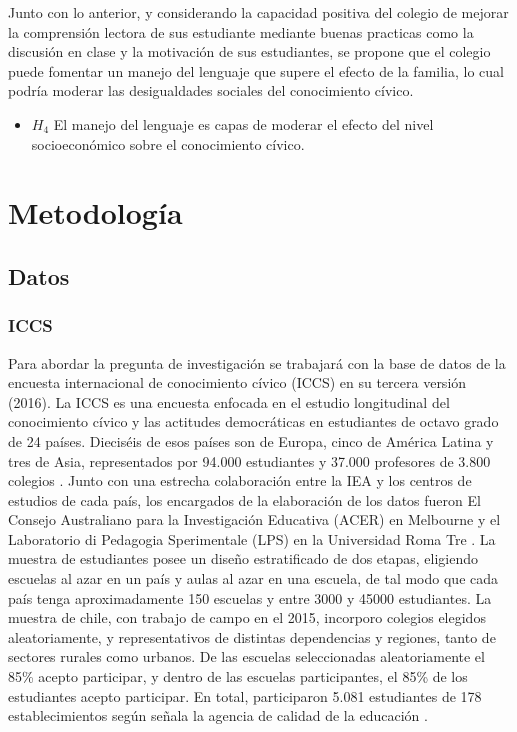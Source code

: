 \documentclass[12pt,twoside]{templates/facsothesis}
\providecommand{\tightlist}{%
  \setlength{\itemsep}{0pt}\setlength{\parskip}{0pt}}
\begin{document}
Junto con lo anterior, y considerando la capacidad positiva del colegio de mejorar la comprensión lectora de sus estudiante mediante buenas practicas como la discusión en clase y la motivación de sus estudiantes, se propone que el colegio puede fomentar un manejo del lenguaje que supere el efecto de la familia, lo cual podría moderar las desigualdades sociales del conocimiento cívico.

\begin{itemize}
\tightlist
\item
  \(H_4\) El manejo del lenguaje es capas de moderar el efecto del nivel socioeconómico sobre el conocimiento cívico.
\end{itemize}

\hypertarget{metodologuxeda}{%
\chapter{Metodología}\label{metodologuxeda}}

\hypertarget{datos}{%
\section{Datos}\label{datos}}

\hypertarget{iccs}{%
\subsection{ICCS}\label{iccs}}

Para abordar la pregunta de investigación se trabajará con la base de datos de la encuesta internacional de conocimiento cívico (ICCS) en su tercera versión (2016). La ICCS es una encuesta enfocada en el estudio longitudinal del conocimiento cívico y las actitudes democráticas en estudiantes de octavo grado de 24 países. Dieciséis de esos países son de Europa, cinco de América Latina y tres de Asia, representados por 94.000 estudiantes y 37.000 profesores de 3.800 colegios \citep{schulzICCS2016Technical2016}. Junto con una estrecha colaboración entre la IEA y los centros de estudios de cada país, los encargados de la elaboración de los datos fueron El Consejo Australiano para la Investigación Educativa (ACER) en Melbourne y el Laboratorio di Pedagogia Sperimentale (LPS) en la Universidad Roma Tre \citep{ieaInternationalCivicCitizenship2016}. La muestra de estudiantes posee un diseño estratificado de dos etapas, eligiendo escuelas al azar en un país y aulas al azar en una escuela, de tal modo que cada país tenga aproximadamente 150 escuelas y entre 3000 y 45000 estudiantes. La muestra de chile, con trabajo de campo en el 2015, incorporo colegios elegidos aleatoriamente, y representativos de distintas dependencias y regiones, tanto de sectores rurales como urbanos. De las escuelas seleccionadas aleatoriamente el 85\% acepto participar, y dentro de las escuelas participantes, el 85\% de los estudiantes acepto participar. En total, participaron 5.081 estudiantes de 178 establecimientos según señala la agencia de calidad de la educación \citep{aceInformeTecnicoSimce2018}.
\end{document}
